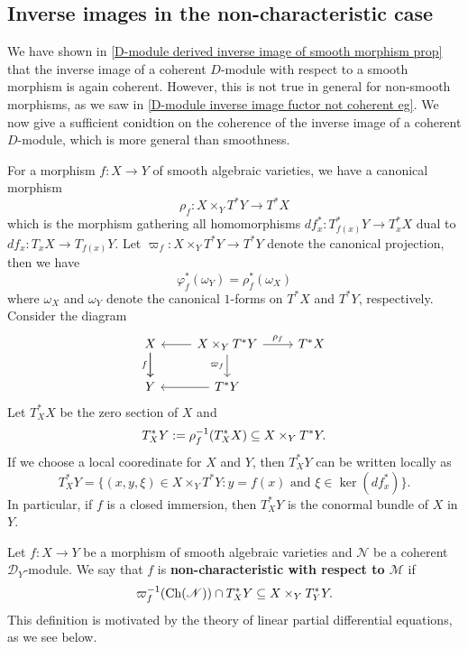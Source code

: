 \subsection{Inverse images in the non-characteristic case}
We have shown in \cref{D-module derived inverse image of smooth morphism prop} that the inverse image of a coherent $D$-module with respect to a smooth morphism is again coherent. However, this is not true in general for non-smooth morphisms, as we saw in \cref{D-module inverse image fuctor not coherent eg}. We now give a sufficient conidtion on the coherence of the inverse image of a coherent $D$-module, which is more general than smoothness.\par
For a morphism $f:X\to Y$ of smooth algebraic varieties, we have a canonical morphism
\[\rho_f:X\times_YT^*Y\to T^*X\]
which is the morphism gathering all homomorphisms $df_x^*:T^*_{f(x)}Y\to T^*_xX$ dual to $df_x:T_xX\to T_{f(x)}Y$. Let $\varpi_f:X\times_YT^*Y\to T^*Y$ denote the canonical projection, then we have
\[\varphi_f^*(\omega_Y)=\rho_f^*(\omega_X)\]
where $\omega_X$ and $\omega_Y$ denote the canonical $1$-forms on $T^*X$ and $T^*Y$, respectively. Consider the diagram
\[\begin{tikzcd}
X\ar[d]\ar[d,swap,"f"]&X\times_YT^*Y\ar[l]\ar[r,"\rho_f"]\ar[d,swap,"\varpi_f"]&T^*X\\
Y&T^*Y\ar[l]
\end{tikzcd}\]
Let $T^*_XX$ be the zero section of $X$ and
\[T^*_XY:=\rho_f^{-1}(T^*_XX)\subseteq X\times_YT^*Y.\]
If we choose a local cooredinate for $X$ and $Y$, then $T^*_XY$ can be written locally as
\[T^*_XY=\{(x,y,\xi)\in X\times_YT^*Y:\text{$y=f(x)$ and $\xi\in\ker(df_x^*)$}\}.\]
In particular, if $f$ is a closed immersion, then $T^*_XY$ is the conormal bundle of $X$ in $Y$.

\begin{lemma}

\end{lemma}

Let $f:X\to Y$ be a morphism of smooth algebraic varieties and $\mathscr{N}$ be a coherent $\mathscr{D}_Y$-module. We say that $f$ is \textbf{non-characteristic with respect to $\mathscr{M}$} if 
\[\varpi_f^{-1}(\mathrm{Ch}(\mathscr{N}))\cap T^*_XY\subseteq X\times_YT_Y^*Y.\]
This definition is motivated by the theory of linear partial differential equations, as we see below.

\begin{example}

\end{example}

